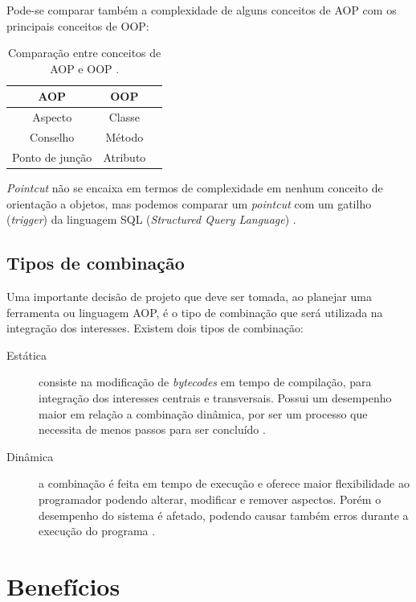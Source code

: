\documentclass[tc,oneside]{iiufrgs}
\begin{document}
Pode-se comparar também a complexidade de alguns conceitos de AOP com os principais conceitos de OOP:

\begin{table}[ht]
	\centering
	\caption{Comparação entre conceitos de AOP e OOP \cite{jacobson2004aspect}.}
	
	\begin{tabular}[h]{c c l}
		\hline 
		\textbf{AOP} & \textbf{OOP} \\
		\hline
		Aspecto&Classe \\
		Conselho&Método \\
		Ponto de junção&Atributo \\
		\hline
	\end{tabular}
	\label{tab:comparacaoAOPOOP}
\end{table}

\textit{Pointcut} não se encaixa em termos de complexidade em nenhum conceito de orientação a objetos, mas podemos comparar um \textit{pointcut} com um gatilho (\textit{trigger}) da linguagem SQL (\textit{Structured Query Language}) \cite{jacobson2004aspect}.

\subsection{Tipos de combinação}

Uma importante decisão de projeto que deve ser tomada, ao planejar uma ferramenta ou linguagem AOP, é o tipo de combinação que será utilizada na integração dos interesses. Existem dois tipos de combinação:

\begin{description}
\item [Estática]  consiste na modificação de \textit{bytecodes} em tempo de compilação, para integração dos interesses centrais e transversais. Possui um desempenho maior em relação a combinação dinâmica, por ser um processo que necessita de menos passos para ser concluído \cite{steinmacher2003estudo}.
\item [Dinâmica] a combinação é feita em tempo de execução e oferece maior flexibilidade ao programador podendo alterar, modificar e remover aspectos. Porém o desempenho do sistema é afetado, podendo causar também erros durante a execução do programa \cite{steinmacher2003estudo}. 
\end{description}

\section{Benefícios}
\end{document}
